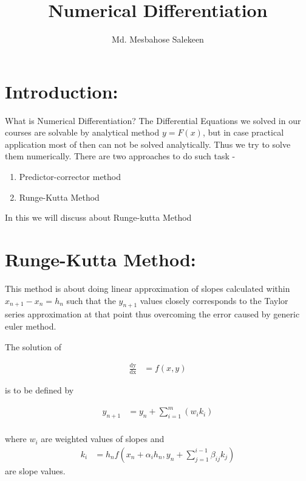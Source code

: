 \documentclass[12 pt]{article}
\title{Numerical Differentiation}
\author{Md. Mesbahose Salekeen}
\date{}
\begin{document}
	\maketitle
	
	\large
	\section*{Introduction:}
	
	What is Numerical Differentiation? The Differential Equations we solved in our courses are solvable by analytical method $y=F(x)$, but in case practical application most of then can not be solved analytically. Thus we try to solve them numerically. There are two approaches to do such task -
	\begin{enumerate}
		\item Predictor-corrector method
		\item Runge-Kutta Method
	\end{enumerate}
	
	In this we will discuss about Runge-kutta Method
	
	\section*{Runge-Kutta Method:}
	
	This method is about doing linear approximation of slopes calculated within $x_{n+1} - x_{n} = h_{n}$ such that the $y_{n+1}$ values closely corresponds to the Taylor series approximation at that point thus overcoming the error caused by generic euler method. 
	
	The solution of 
	
	{
		\Large
		\begin{equation}\label{E3}
			\begin{split}
				\frac{\mathop{\mathrm{d}y}}{\mathop{\mathrm{d}x}} &= f(x,y)
			\end{split}
		\end{equation}
	}
	
	is to be defined by
	
	{
		\Large
		\begin{equation}\label{E1}
			\begin{split}
				y_{n+1} & = y_{n} + \sum_{i=1}^{m}(w_{i}k_{i}) \\
			\end{split}
		\end{equation}
	}
	
	where $w_{i}$ are weighted values of slopes and 
	{
		\Large
		\begin{equation}\label{E2}
			\begin{split}
				k_{i} &= h_{n}f(x_{n}+\alpha_{i}h_{n}, y_{n}+\sum_{j=1}^{i-1}\beta_{ij}k_{j})
			\end{split}
		\end{equation}
	}
	are slope values.
	
\end{document}

